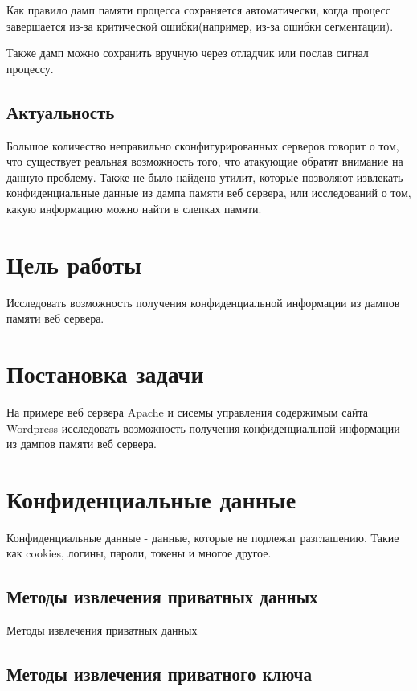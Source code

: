 \documentclass[20pt]{article}
\begin{document}
Как правило дамп памяти процесса сохраняется автоматически, когда процесс
завершается из-за критической ошибки(например, из-за ошибки сегментации).

Также дамп можно сохранить вручную через отладчик или послав сигнал процессу.

\subsection{Актуальность}
Большое количество неправильно сконфигурированных серверов говорит о том, что
существует реальная возможность того, что атакующие обратят внимание на данную
проблему. Также не было найдено утилит, которые позволяют извлекать
конфиденциальные данные из дампа памяти веб сервера, или исследований о том,
какую информацию можно найти в слепках памяти.

\newpage

\section{Цель работы}
Исследовать возможность получения конфиденциальной информации из дампов памяти веб сервера.

\newpage

\section{Постановка задачи}
На примере веб сервера Apache и сисемы управления содержимым сайта Wordpress
исследовать возможность получения конфиденциальной информации из дампов памяти
веб сервера.

\newpage

\section{Конфиденциальные данные}
Конфиденциальные данные - данные, которые не подлежат разглашению. Такие как
cookies, логины, пароли, токены и многое другое.

\subsection{Методы извлечения приватных данных}
Методы извлечения приватных данных

\subsection{Методы извлечения приватного ключа}
\end{document}
